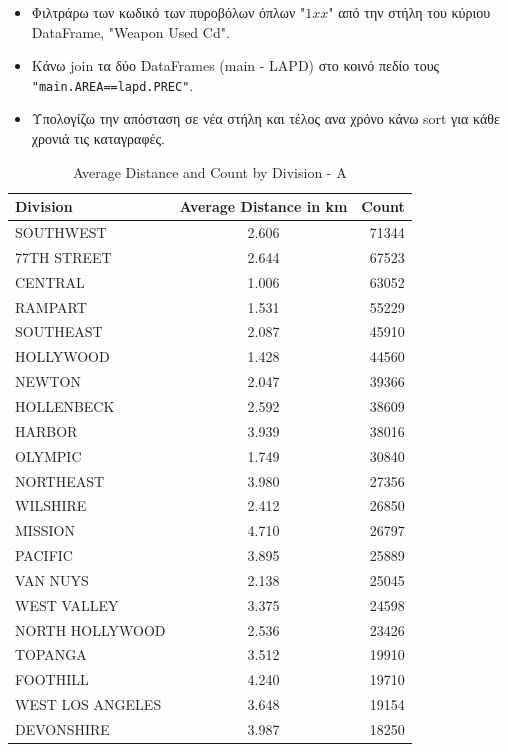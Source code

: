\documentclass{article}
\begin{document}
\begin{itemize}
    \item   Φιλτράρω των κωδικό των πυροβόλων όπλων "$1xx$" από την στήλη του κύριου DataFrame, "Weapon Used Cd".
    \item   Κάνω  join  τα δύο  DataFrames (main - LAPD)  στο κοινό πεδίο τους  \texttt{"main.AREA==lapd.PREC"}.
    \item   {}Υπολογίζω την απόσταση σε νέα στήλη και τέλος ανα χρόνο κάνω  sort  για κάθε χρονιά τις καταγραφές.
\end{itemize}

\begin{table}[h]
\centering
\begin{tabular}{|l|c|r|}
\hline
Division        & Average Distance in km & Count \\ \hline
SOUTHWEST       & 2.606 & 71344 \\ \hline
77TH STREET     & 2.644 & 67523 \\ \hline
CENTRAL         & 1.006 & 63052 \\ \hline
RAMPART         & 1.531 & 55229 \\ \hline
SOUTHEAST       & 2.087 & 45910 \\ \hline
HOLLYWOOD       & 1.428 & 44560 \\ \hline
NEWTON          & 2.047 & 39366 \\ \hline
HOLLENBECK      & 2.592 & 38609 \\ \hline
HARBOR          & 3.939 & 38016 \\ \hline
OLYMPIC         & 1.749 & 30840 \\ \hline
NORTHEAST       & 3.980 & 27356 \\ \hline
WILSHIRE        & 2.412 & 26850 \\ \hline
MISSION         & 4.710 & 26797 \\ \hline
PACIFIC         & 3.895 & 25889 \\ \hline
VAN NUYS        & 2.138 & 25045 \\ \hline
WEST VALLEY     & 3.375 & 24598 \\ \hline
NORTH HOLLYWOOD & 2.536 & 23426 \\ \hline
TOPANGA         & 3.512 & 19910 \\ \hline
FOOTHILL        & 4.240 & 19710 \\ \hline
WEST LOS ANGELES& 3.648 & 19154 \\ \hline
DEVONSHIRE      & 3.987 & 18250 \\ \hline
\end{tabular}
\caption{Average Distance and Count by Division - A}
\label{table:division_distance_count_a}
\end{table}
\end{document}
